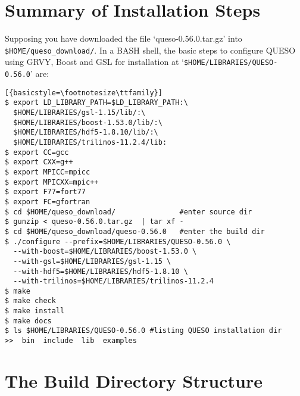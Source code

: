 \section{Summary of Installation Steps}\label{sec:summary}


Supposing you have downloaded the file `queso-0.56.0.tar.gz' into \texttt{\$HOME/queso\_download/}.
%
In a BASH shell, the basic steps to configure QUESO using GRVY, Boost and GSL for installation at
`\verb+$HOME/LIBRARIES/QUESO-0.56.0+'  are:

\begin{lstlisting}[{basicstyle=\footnotesize\ttfamily}]
$ export LD_LIBRARY_PATH=$LD_LIBRARY_PATH:\
  $HOME/LIBRARIES/gsl-1.15/lib/:\
  $HOME/LIBRARIES/boost-1.53.0/lib/:\
  $HOME/LIBRARIES/hdf5-1.8.10/lib/:\
  $HOME/LIBRARIES/trilinos-11.2.4/lib:
$ export CC=gcc
$ export CXX=g++
$ export MPICC=mpicc
$ export MPICXX=mpic++
$ export F77=fort77
$ export FC=gfortran
$ cd $HOME/queso_download/               #enter source dir
$ gunzip < queso-0.56.0.tar.gz  | tar xf -
$ cd $HOME/queso_download/queso-0.56.0   #enter the build dir
$ ./configure --prefix=$HOME/LIBRARIES/QUESO-0.56.0 \
  --with-boost=$HOME/LIBRARIES/boost-1.53.0 \
  --with-gsl=$HOME/LIBRARIES/gsl-1.15 \
  --with-hdf5=$HOME/LIBRARIES/hdf5-1.8.10 \
  --with-trilinos=$HOME/LIBRARIES/trilinos-11.2.4
$ make
$ make check
$ make install
$ make docs
$ ls $HOME/LIBRARIES/QUESO-0.56.0 #listing QUESO installation dir
>>  bin  include  lib  examples
\end{lstlisting}

%
%


\section{The Build Directory Structure} \label{sc-source-dir-structure}

